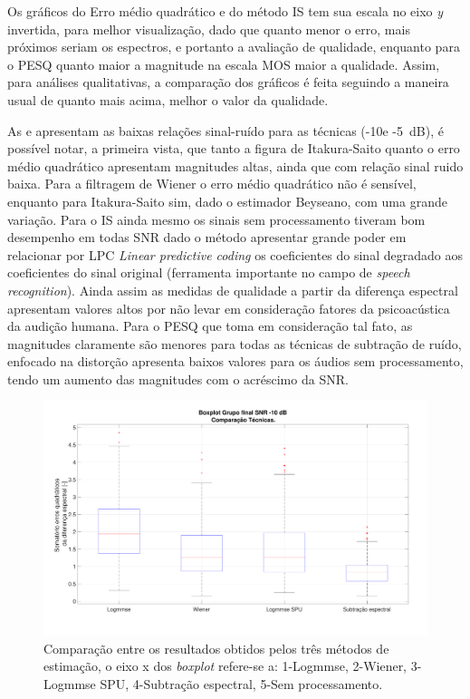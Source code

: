 Os gráficos do Erro médio quadrático e do método IS tem sua escala no eixo \textit{y} invertida, para melhor visualização, dado que quanto menor o erro, mais próximos seriam os espectros, e portanto a avaliação de qualidade, enquanto para o PESQ quanto maior a magnitude na escala MOS maior a qualidade. Assim, para análises qualitativas, a comparação dos gráficos é feita seguindo a maneira usual de quanto mais acima, melhor o valor da qualidade.

As  e  apresentam as baixas relações sinal-ruído para as técnicas (-10e -5~dB), é possível notar, a primeira vista, que tanto a figura de Itakura-Saito quanto o erro médio quadrático apresentam magnitudes altas, ainda que com relação sinal ruido baixa. Para a filtragem de Wiener o erro médio quadrático não é sensível, enquanto para Itakura-Saito sim, dado o estimador Beyseano, com uma grande variação. Para o IS ainda mesmo os sinais sem processamento tiveram bom desempenho em todas SNR dado o método apresentar grande poder em relacionar por LPC \textit{Linear predictive coding} os coeficientes do sinal degradado aos coeficientes do sinal original (ferramenta importante no campo de \textit{speech recognition}). Ainda assim as medidas de qualidade a partir da diferença espectral apresentam valores altos por não levar em consideração fatores da psicoacústica da audição humana. Para o PESQ que toma em consideração tal fato, as magnitudes claramente são menores para todas as técnicas de subtração de ruído, enfocado na distorção apresenta baixos valores para os áudios sem processamento, tendo um aumento das magnitudes com o acréscimo da SNR. 
 

\begin{figure}[H]
\centering
\includegraphics[width=1\linewidth]{Figs/Total_m10}
\caption{Comparação entre os resultados obtidos pelos três métodos de estimação, o eixo x dos \textit{boxplot} refere-se a: 1-Logmmse, 2-Wiener, 3-Logmmse SPU, 4-Subtração espectral, 5-Sem processamento.}
\label{q1}
\end{figure}

